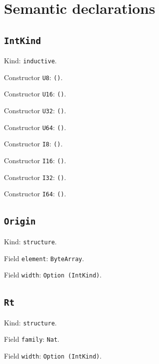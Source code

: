 \documentclass[11pt]{article}
\begin{document}
\section*{Semantic declarations}
\subsection*{\texttt{IntKind}}
\noindent Kind: \texttt{inductive}.\par
\noindent Constructor \texttt{U8}: \texttt{()}.\par
\noindent Constructor \texttt{U16}: \texttt{()}.\par
\noindent Constructor \texttt{U32}: \texttt{()}.\par
\noindent Constructor \texttt{U64}: \texttt{()}.\par
\noindent Constructor \texttt{I8}: \texttt{()}.\par
\noindent Constructor \texttt{I16}: \texttt{()}.\par
\noindent Constructor \texttt{I32}: \texttt{()}.\par
\noindent Constructor \texttt{I64}: \texttt{()}.\par
\subsection*{\texttt{Origin}}
\noindent Kind: \texttt{structure}.\par
\noindent Field \texttt{element}: \texttt{ByteArray}.\par
\noindent Field \texttt{width}: \texttt{Option (IntKind)}.\par
\subsection*{\texttt{Rt}}
\noindent Kind: \texttt{structure}.\par
\noindent Field \texttt{family}: \texttt{Nat}.\par
\noindent Field \texttt{width}: \texttt{Option (IntKind)}.\par
\end{document}
